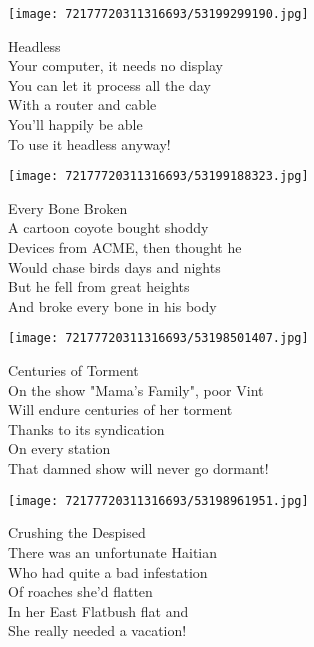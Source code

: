 \documentclass[10pt,letterpaper]{article}
\begin{document}
\begin{center}\texttt{[image: 72177720311316693/53199299190.jpg]}
\end{center}
\begin{center}
Headless\\
\vskip 0.2in
Your computer, it needs no display\\
You can let it process all the day\\
With a router and cable\\
You'll happily be able\\
To use it headless anyway!\\
\end{center}
\pagebreak

\begin{center}
\texttt{[image: 72177720311316693/53199188323.jpg]}
\end{center}

\begin{center}
Every Bone Broken\\
\vskip 0.2in
A cartoon coyote bought shoddy\\
Devices from ACME, then thought he\\
Would chase birds days and nights\\
But he fell from great heights\\
And broke every bone in his body\\
\end{center}
\pagebreak

\begin{center}\texttt{[image: 72177720311316693/53198501407.jpg]}
\end{center}
\begin{center}
Centuries of Torment\\
\vskip 0.2in
On the show "Mama's Family", poor Vint\\
Will endure centuries of her torment\\
Thanks to its syndication\\
On every station\\
That damned show will never go dormant!\\
\end{center}
\pagebreak

\begin{center}\texttt{[image: 72177720311316693/53198961951.jpg]}
\end{center}
\begin{center}
Crushing the Despised\\
\vskip 0.2in
There was an unfortunate Haitian\\
Who had quite a bad infestation\\
Of roaches she'd flatten\\
In her East Flatbush flat and\\
She really needed a vacation!\\
\end{center}
\pagebreak
\end{document}
